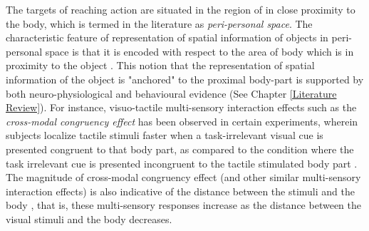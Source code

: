 
The targets of reaching action are situated in the region of in close proximity to the body, which is termed in the literature as \emph{peri-personal space}. The characteristic feature of representation of spatial information of objects in peri-personal space is that it is encoded with respect to the area of body which is in proximity to the object \cite{serino2019peripersonal}.
 This notion that the representation of spatial information of the object is "anchored" to the proximal body-part is supported by both neuro-physiological and behavioural evidence (See Chapter \ref{Literature Review}). For instance, visuo-tactile multi-sensory interaction effects such as the \emph{cross-modal congruency effect} has been observed in certain experiments, wherein subjects localize tactile stimuli faster when a task-irrelevant visual cue is presented congruent to that body part, as compared to the condition where the task irrelevant cue is presented incongruent to the tactile stimulated body part \cite{spence2004multisensory}. The magnitude of cross-modal congruency effect (and other similar multi-sensory interaction effects) is also indicative of the distance between the stimuli and the body \cite{spence2004spatial, iachini2014motor}, that is, these multi-sensory responses increase as the distance between the visual stimuli and the body decreases. 
 

